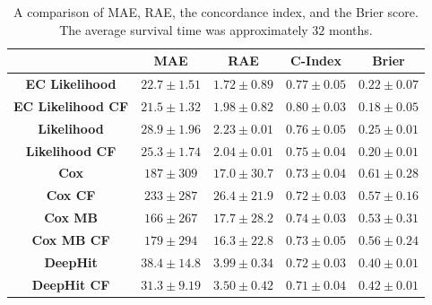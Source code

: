         \begin{table}
            \centering
            
            \captionsetup{singlelinecheck=false}
            \caption{
                A comparison of \gls{MAE}, \gls{RAE}, the concordance index, and the Brier score. The average survival time was approximately $32$ months.
            }
            
            \resizebox*{1.0\linewidth}{!}
            {
                \begin{tabular}{||c|cc|c|c||}
                    \hline
                                                            & \textbf{\gls{MAE}} & \textbf{\gls{RAE}} & \textbf{C-Index}  & \textbf{Brier}    \\
                    \hline
                    \textbf{\gls{EC} Likelihood}            & $22.7\pm1.51$      & $1.72\pm0.89$      & $0.77\pm0.05$     & $0.22\pm0.07$      \\
                    \textbf{\gls{EC} Likelihood \gls{CF}}   & $21.5\pm1.32$      & $1.98\pm0.82$      & $0.80\pm0.03$     & $0.18\pm0.05$      \\
                    \textbf{Likelihood}                    & $28.9\pm1.96$      & $2.23\pm0.01$      & $0.76\pm0.05$     & $0.25\pm0.01$      \\
                    \textbf{Likelihood \gls{CF}}           & $25.3\pm1.74$      & $2.04\pm0.01$      & $0.75\pm0.04$     & $0.20\pm0.01$      \\
                    \hline
                    \textbf{Cox}                           & $187 \pm309 $      & $17.0\pm30.7$      & $0.73\pm0.04$     & $0.61\pm0.28$      \\
                    \textbf{Cox \gls{CF}}                  & $233 \pm287 $      & $26.4\pm21.9$      & $0.72\pm0.03$     & $0.57\pm0.16$      \\
                    \textbf{Cox \gls{MB}}                  & $166 \pm267 $      & $17.7\pm28.2$      & $0.74\pm0.03$     & $0.53\pm0.31$      \\
                    \textbf{Cox \gls{MB} \gls{CF}}         & $179 \pm294 $      & $16.3\pm22.8$      & $0.73\pm0.05$     & $0.56\pm0.24$      \\
                    \hline
                    \textbf{DeepHit}                       & $38.4\pm14.8$      & $3.99\pm0.34$      & $0.72\pm0.03$     & $0.40\pm0.01$      \\
                    \textbf{DeepHit \gls{CF}}              & $31.3\pm9.19$      & $3.50\pm0.42$      & $0.71\pm0.04$     & $0.42\pm0.01$      \\
                    \hline
                \end{tabular}
            }
            \label{tab:deep_learning_for_ct_based_survival_analysis_of_idiopathic_pulmonary_fibrosis_patients_appendix_results_table}
        \end{table}
    
